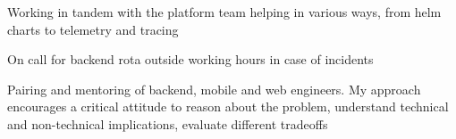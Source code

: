 \begin{cventries}
{\begin{cvitems}
  \item Working in tandem with the platform team helping in various ways, from helm charts to telemetry and tracing %
    \item On call for backend rota outside working hours in case of incidents 
 \item Pairing and mentoring of backend, mobile and web engineers. My approach encourages a critical attitude to reason about the problem, understand technical and non-technical implications, evaluate different tradeoffs 
	\end{cvitems}
}


\end{cventries}

